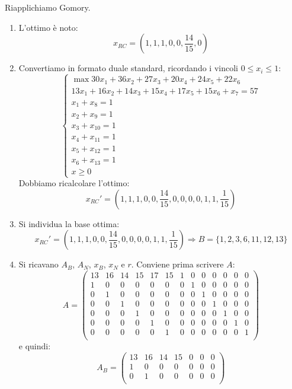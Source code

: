 \documentclass[a4paper,11pt]{article}
\begin{document}
Riapplichiamo Gomory.
\begin{enumerate}
	\item L'ottimo è noto:
$$
x_{RC} = \left( 1, 1, 1, 0, 0, \frac{14}{15}, 0 \right)
$$
	\item Convertiamo in formato duale standard, ricordando i vincoli $0 \leq x_i \leq 1$:
\[
	\begin{cases}	
		\max 30 x_1 + 36 x_2 + 27 x_3 + 20 x_4 + 24 x_5 + 22 x_6 \\ 
		13 x_1 + 16 x_2 + 14 x_3 + 15 x_4 +17 x_5 + 15 x_6 + x_7 = 57 \\ 
		x_1 + x_8 = 1 \\
		x_2 + x_9 = 1 \\
		
		x_3 + x_{10} = 1 \\
		x_4 + x_{11} = 1 \\
		x_5 + x_{12} = 1 \\
		x_6 + x_{13} = 1 \\
		x \geq 0
	\end{cases}
\]
Dobbiamo ricalcolare l'ottimo:
$$ 
x_{RC}' = \left( 1, 1, 1, 0, 0, \frac{14}{15}, 0, 0, 0, 0, 1, 1, \frac{1}{15} \right)
$$
\item Si individua la base ottima:
$$
x_{RC}' = \left( 1, 1, 1, 0, 0, \frac{14}{15}, 0, 0, 0, 0, 1, 1, \frac{1}{15} \right) \Rightarrow B = \{1, 2, 3, 6, 11, 12, 13\}
$$
\item Si ricavano $A_B$, $A_N$, $x_B$, $x_N$ e $r$.
	Conviene prima scrivere $A$:
	\setcounter{MaxMatrixCols}{200}
	$$
	A = 
	\begin{pmatrix}
		13 & 16 & 14 & 15 & 17 & 15 & 1 & 0 & 0 & 0 & 0 & 0 & 0 \\
		1 & 0 & 0 & 0 & 0 & 0 & 0 & 1 & 0 & 0 & 0 & 0 & 0 \\
		0 & 1 & 0 & 0 & 0 & 0 & 0 & 0 & 1 & 0 & 0 & 0 & 0 \\
		0 & 0 & 1 & 0 & 0 & 0 & 0 & 0 & 0 & 1 & 0 & 0 & 0 \\
		0 & 0 & 0 & 1 & 0 & 0 & 0 & 0 & 0 & 0 & 1 & 0 & 0 \\
		0 & 0 & 0 & 0 & 1 & 0 & 0 & 0 & 0 & 0 & 0 & 1 & 0 \\
		0 & 0 & 0 & 0 & 0 & 1 & 0 & 0 & 0 & 0 & 0 & 0 & 1 \\
	\end{pmatrix}
	$$
	e quindi:
	$$
	A_B = 
	\begin{pmatrix}
		13 & 16 & 14 & 15 & 0 & 0 & 0 \\
		1 & 0 & 0 & 0 & 0 & 0 & 0 \\
		0 & 1 & 0 & 0 & 0 & 0 & 0 \\

\end{pmatrix}$$
\end{enumerate}
\end{document}
